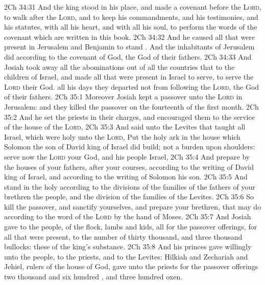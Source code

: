 \vs 2Ch 34:31 And the king stood in his place, and made a covenant before the \textsc{Lord}, to walk after the \textsc{Lord}, and to keep his commandments, and his testimonies, and his statutes, with all his heart, and with all his soul, to perform the words of the covenant which are written in this book.
\vs 2Ch 34:32 And he caused all that were present in Jerusalem and Benjamin to stand . And the inhabitants of Jerusalem did according to the covenant of God, the God of their fathers.
\vs 2Ch 34:33 And Josiah took away all the abominations out of all the countries that  to the children of Israel, and made all that were present in Israel to serve,  to serve the \textsc{Lord} their God.  all his days they departed not from following the \textsc{Lord}, the God of their fathers.
\vs 2Ch 35:1 Moreover Josiah kept a passover unto the \textsc{Lord} in Jerusalem: and they killed the passover on the fourteenth  of the first month.
\vs 2Ch 35:2 And he set the priests in their charges, and encouraged them to the service of the house of the \textsc{Lord},
\vs 2Ch 35:3 And said unto the Levites that taught all Israel, which were holy unto the \textsc{Lord}, Put the holy ark in the house which Solomon the son of David king of Israel did build;  not  a burden upon  shoulders: serve now the \textsc{Lord} your God, and his people Israel,
\vs 2Ch 35:4 And prepare  by the houses of your fathers, after your courses, according to the writing of David king of Israel, and according to the writing of Solomon his son.
\vs 2Ch 35:5 And stand in the holy  according to the divisions of the families of the fathers of your brethren the people, and  the division of the families of the Levites.
\vs 2Ch 35:6 So kill the passover, and sanctify yourselves, and prepare your brethren, that  may do according to the word of the \textsc{Lord} by the hand of Moses.
\vs 2Ch 35:7 And Josiah gave to the people, of the flock, lambs and kids, all for the passover offerings, for all that were present, to the number of thirty thousand, and three thousand bullocks: these  of the king's substance.
\vs 2Ch 35:8 And his princes gave willingly unto the people, to the priests, and to the Levites: Hilkiah and Zechariah and Jehiel, rulers of the house of God, gave unto the priests for the passover offerings two thousand and six hundred , and three hundred oxen.
